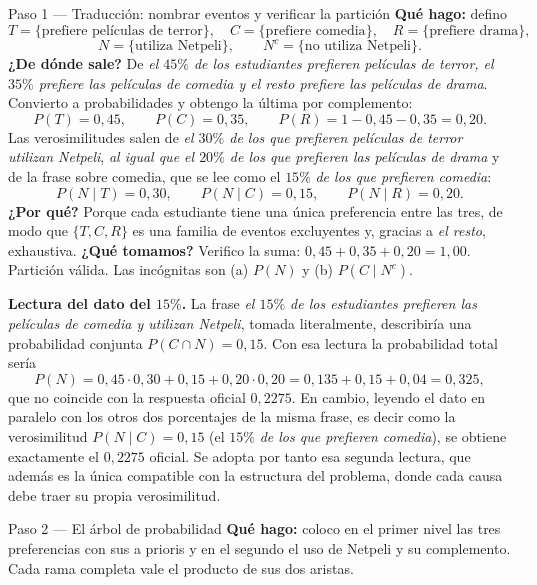 \documentclass[11pt]{article}
\begin{document}
\begin{sol}

\begin{paso}{Paso 1 --- Traducción: nombrar eventos y verificar la partición}
\textbf{Qué hago:} defino
\[
T=\{\text{prefiere películas de terror}\},\quad C=\{\text{prefiere comedia}\},\quad R=\{\text{prefiere drama}\},
\]
\[
N=\{\text{utiliza Netpeli}\},\qquad N^{c}=\{\text{no utiliza Netpeli}\}.
\]
\textbf{¿De dónde sale?} De \emph{el $45\%$ de los estudiantes prefieren películas de terror, el $35\%$ prefiere las películas de comedia y el resto prefiere las películas de drama}. Convierto a probabilidades y obtengo la última por complemento:
\[
P(T)=0,45,\qquad P(C)=0,35,\qquad P(R)=1-0,45-0,35=0,20 .
\]
Las verosimilitudes salen de \emph{el $30\%$ de los que prefieren películas de terror utilizan Netpeli}, \emph{al igual que el $20\%$ de los que prefieren las películas de drama} y de la frase sobre comedia, que se lee como el $15\%$ \emph{de los que prefieren comedia}:
\[
P(N\mid T)=0,30,\qquad P(N\mid C)=0,15,\qquad P(N\mid R)=0,20 .
\]
\textbf{¿Por qué?} Porque cada estudiante tiene una única preferencia entre las tres, de modo que $\{T,C,R\}$ es una familia de eventos excluyentes y, gracias a \emph{el resto}, exhaustiva.
\textbf{¿Qué tomamos?} Verifico la suma: $0,45+0,35+0,20=1,00$. Partición válida. Las incógnitas son (a) $P(N)$ y (b) $P(C\mid N^{c})$.
\end{paso}

\begin{nota}
\textbf{Lectura del dato del $15\%$.} La frase \emph{el $15\%$ de los estudiantes prefieren las películas de comedia y utilizan Netpeli}, tomada literalmente, describiría una probabilidad conjunta $P(C\cap N)=0,15$. Con esa lectura la probabilidad total sería
\[
P(N)=0,45\cdot 0,30+0,15+0,20\cdot 0,20=0,135+0,15+0,04=0,325,
\]
que no coincide con la respuesta oficial $0,2275$. En cambio, leyendo el dato en paralelo con los otros dos porcentajes de la misma frase, es decir como la verosimilitud $P(N\mid C)=0,15$ (el $15\%$ \emph{de los que prefieren comedia}), se obtiene exactamente el $0,2275$ oficial. Se adopta por tanto esa segunda lectura, que además es la única compatible con la estructura del problema, donde cada causa debe traer su propia verosimilitud.
\end{nota}

\begin{paso}{Paso 2 --- El árbol de probabilidad}
\textbf{Qué hago:} coloco en el primer nivel las tres preferencias con sus a prioris y en el segundo el uso de Netpeli y su complemento. Cada rama completa vale el producto de sus dos aristas.


\end{paso}
\end{sol}
\end{document}
